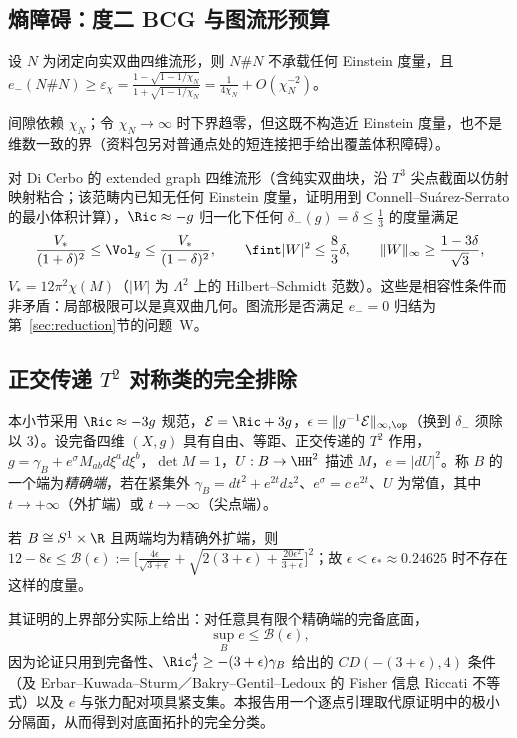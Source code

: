 \subsection{熵障碍：度二 BCG 与图流形预算}
\begin{proposition}\label{prop:BCG}
设 $N$ 为闭定向实双曲四维流形，则 $N\#N$ 不承载任何 Einstein 度量，且 $e_-(N\#N)\ge\varepsilon_\chi=\frac{1-\sqrt{1-1/\chi_N}}{1+\sqrt{1-1/\chi_N}}=\frac1{4\chi_N}+O(\chi_N^{-2})$。
\end{proposition}
间隙依赖 $\chi_N$；令 $\chi_N\to\infty$ 时下界趋零，但这既不构造近 Einstein 度量，也不是维数一致的界（资料包另对普通点处的短连接把手给出覆盖体积障碍）。

对 Di Cerbo \cite{DiCerbo} 的 extended graph 四维流形（含纯实双曲块，沿 $T^3$ 尖点截面以仿射映射粘合；该范畴内已知无任何 Einstein 度量，证明用到 Connell--Suárez-Serrato \cite{CSS} 的最小体积计算），$\Ric\approx-g$ 归一化下任何 $\delta_-(g)=\delta\le\frac13$ 的度量满足
\[
\frac{V_*}{(1+\delta)^2}\le\Vol_g\le\frac{V_*}{(1-\delta)^2},\qquad \fint|W|^2\le\frac83\delta,\qquad \|W\|_\infty\ge\frac{1-3\delta}{\sqrt3},
\]
$V_*=12\pi^2\chi(M)$（$|W|$ 为 $\Lambda^2$ 上的 Hilbert--Schmidt 范数）。这些是相容性条件而非矛盾：局部极限可以是真双曲几何。图流形是否满足 $e_-=0$ 归结为第~\ref{sec:reduction}节的问题~W。

\subsection{正交传递 $T^2$ 对称类的完全排除}
本小节采用 $\Ric\approx-3g$ 规范，$\mathcal E=\Ric+3g$，$\epsilon=\|g^{-1}\mathcal E\|_{\infty,\op}$（换到 $\delta_-$ 须除以 $3$）。设完备四维 $(X,g)$ 具有自由、等距、正交传递的 $T^2$ 作用，$g=\gamma_B+e^\sigma M_{ab}d\xi^ad\xi^b$，$\det M=1$，$U:B\to\HH^2$ 描述 $M$，$e=|dU|^2$。称 $B$ 的一个端为\emph{精确端}，若在紧集外 $\gamma_B=dt^2+e^{2t}dz^2$、$e^\sigma=c\,e^{2t}$、$U$ 为常值，其中 $t\to+\infty$（外扩端）或 $t\to-\infty$（尖点端）。

\begin{theorem}\label{thm:OT}
若 $B\cong S^1\times\R$ 且两端均为精确外扩端，则 $12-8\epsilon\le\mathcal B(\epsilon):=\bigl[\frac{4\epsilon}{\sqrt{3+\epsilon}}+\sqrt{2(3+\epsilon)+\frac{20\epsilon^2}{3+\epsilon}}\bigr]^2$；故 $\epsilon<\epsilon_*\approx0.24625$ 时不存在这样的度量。
\end{theorem}
其证明的上界部分实际上给出：对任意具有限个精确端的完备底面，
\begin{equation}\label{eq:supe}
\sup_Be\le\mathcal B(\epsilon),
\end{equation}
因为论证只用到完备性、$\Ric^4_f\ge-(3+\epsilon)\gamma_B$ 给出的 $CD(-(3+\epsilon),4)$ 条件（及 Erbar--Kuwada--Sturm／Bakry--Gentil--Ledoux 的 Fisher 信息 Riccati 不等式）以及 $e$ 与张力配对项具紧支集。本报告用一个逐点引理取代原证明中的极小分隔面，从而得到对底面拓扑的完全分类。

